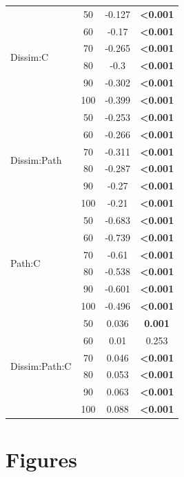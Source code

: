 \documentclass[12pt]{article}
\begin{document}
\begin{table}[h!]
\begin{tabular}{l | c c c |}
		\hline
		\multirow{6}{*}{Dissim:C}&50&-0.127&\textbf{\textless0.001}\\ 
		&60&-0.17&\textbf{\textless0.001}\\ 
		&70&-0.265&\textbf{\textless0.001}\\ 
		&80&-0.3&\textbf{\textless0.001}\\ 
		&90&-0.302&\textbf{\textless0.001}\\ 
		&100&-0.399&\textbf{\textless0.001}\\ 
		\hline
		\multirow{6}{*}{Dissim:Path}&50&-0.253&\textbf{\textless0.001}\\ 
		&60&-0.266&\textbf{\textless0.001}\\ 
		&70&-0.311&\textbf{\textless0.001}\\ 
		&80&-0.287&\textbf{\textless0.001}\\ 
		&90&-0.27&\textbf{\textless0.001}\\ 
		&100&-0.21&\textbf{\textless0.001}\\ 
		\hline
		\multirow{6}{*}{Path:C}&50&-0.683&\textbf{\textless0.001}\\ 
		&60&-0.739&\textbf{\textless0.001}\\ 
		&70&-0.61&\textbf{\textless0.001}\\ 
		&80&-0.538&\textbf{\textless0.001}\\ 
		&90&-0.601&\textbf{\textless0.001}\\ 
		&100&-0.496&\textbf{\textless0.001}\\ 
		\hline
		\multirow{6}{*}{Dissim:Path:C}&50&0.036&\textbf{0.001}\\ 
		&60&0.01&0.253\\ 
		&70&0.046&\textbf{\textless0.001}\\ 
		&80&0.053&\textbf{\textless0.001}\\ 
		&90&0.063&\textbf{\textless0.001}\\ 
		&100&0.088&\textbf{\textless0.001}\\ 
		\hline
		\end{tabular}
		\end{table}	

\section*{Figures}
\end{document}

